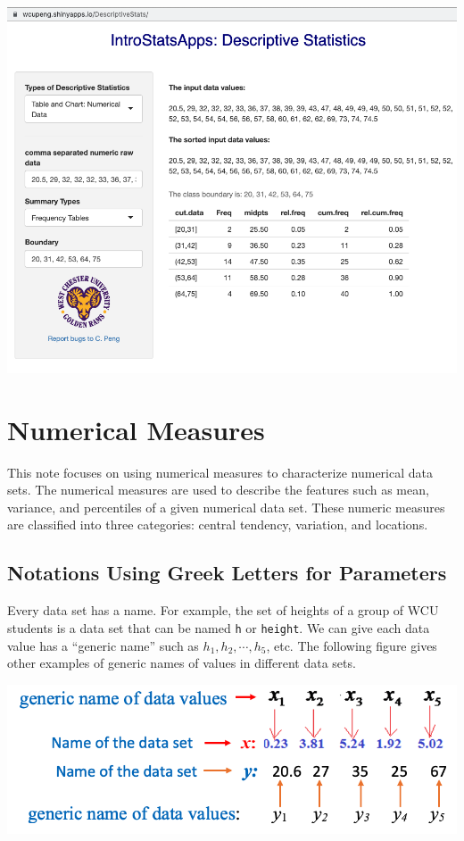\documentclass[
]{book}
\begin{document}
\begin{center}\includegraphics[width=0.8\linewidth]{week01/numFreq} \end{center}

\hypertarget{numerical-measures}{%
\chapter{Numerical Measures}\label{numerical-measures}}

This note focuses on using numerical measures to characterize numerical data sets. The numerical measures are used to describe the features such as mean, variance, and percentiles of a given numerical data set. These numeric measures are classified into three categories: central tendency, variation, and locations.

\hypertarget{notations-using-greek-letters-for-parameters}{%
\section{Notations Using Greek Letters for Parameters}\label{notations-using-greek-letters-for-parameters}}

Every data set has a name. For example, the set of heights of a group of WCU students is a data set that can be named \texttt{h} or \texttt{height}. We can give each data value has a ``generic name'' such as \(h_1, h_2, \cdots, h_5\), etc. The following figure gives other examples of generic names of values in different data sets.

\begin{center}\includegraphics[width=0.6\linewidth]{week02/genericNames} \end{center}
\end{document}
